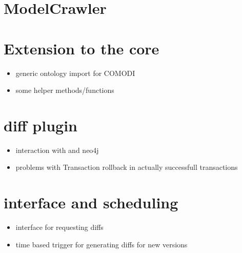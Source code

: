 
\section{ModelCrawler}

\section{Extension to the \masymos core}
	\begin{itemize}
		\item generic ontology import for COMODI
		\item some helper methods/functions
	\end{itemize}

\section{\masymos diff plugin}
	\begin{itemize}
		\item interaction with \bives and neo4j
		\item problems with Transaction rollback in actually successfull transactions
	\end{itemize}

\section{\rest interface and scheduling}
	\begin{itemize}
		\item \rest interface for requesting diffs
		\item time based trigger for generating diffs for new versions
	\end{itemize}

